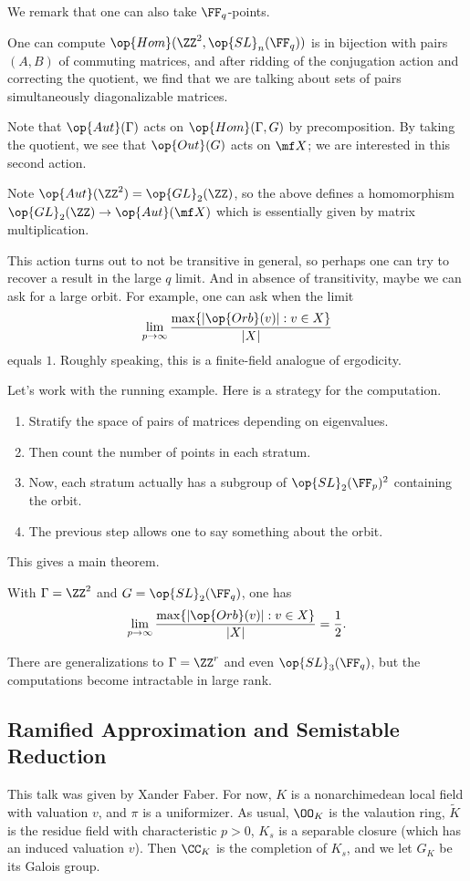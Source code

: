 \documentclass{article}
\begin{document}
We remark that one can also take $\FF_q$-points.
\begin{example}
	One can compute $\op{Hom}(\ZZ^2,\op{SL}_n(\FF_q))$ is in bijection with pairs $(A,B)$ of commuting matrices, and after ridding of the conjugation action and correcting the quotient, we find that we are talking about sets of pairs simultaneously diagonalizable matrices.
\end{example}
Note that $\op{Aut}(\Gamma)$ acts on $\op{Hom}(\Gamma,G)$ by precomposition. By taking the quotient, we see that $\op{Out}(G)$ acts on $\mf X$; we are interested in this second action.
\begin{example}
	Note $\op{Aut}(\ZZ^2)=\op{GL}_2(\ZZ)$, so the above defines a homomorphism $\op{GL}_2(\ZZ)\to\op{Aut}(\mf X)$ which is essentially given by matrix multiplication.
\end{example}
This action turns out to not be transitive in general, so perhaps one can try to recover a result in the large $q$ limit. And in absence of transitivity, maybe we can ask for a large orbit. For example, one can ask when the limit
\[\lim_{p\to\infty}\frac{\max\{\left|\op{Orb}(v)\right|:v\in X\}}{\left|X\right|}\]
equals $1$. Roughly speaking, this is a finite-field analogue of ergodicity.

Let's work with the running example. Here is a strategy for the computation.
\begin{enumerate}
	\item Stratify the space of pairs of matrices depending on eigenvalues.
	\item Then count the number of points in each stratum.
	\item Now, each stratum actually has a subgroup of $\op{SL}_2(\FF_p)^2$ containing the orbit.
	\item The previous step allows one to say something about the orbit.
\end{enumerate}
This gives a main theorem.
\begin{theorem}
	With $\Gamma=\ZZ^2$ and $G=\op{SL}_2(\FF_q)$, one has
	\[\lim_{p\to\infty}\frac{\max\{\left|\op{Orb}(v)\right|:v\in X\}}{\left|X\right|}=\frac12.\]
\end{theorem}
There are generalizations to $\Gamma=\ZZ^r$ and even $\op{SL}_3(\FF_q)$, but the computations become intractable in large rank.

\subsection{Ramified Approximation and Semistable Reduction}
This talk was given by Xander Faber. For now, $K$ is a nonarchimedean local field with valuation $v$, and $\pi$ is a uniformizer. As usual, $\OO_K$ is the valaution ring, $\widetilde K$ is the residue field with characteristic $p>0$, $K_s$ is a separable closure (which has an induced valuation $v$). Then $\CC_K$ is the completion of $K_s$, and we let $G_K$ be its Galois group.
\end{document}
